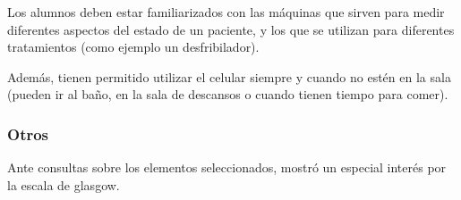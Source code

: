 Los alumnos deben estar familiarizados con las máquinas que sirven para
medir diferentes aspectos del estado de un paciente, y los que se
utilizan para diferentes tratamientos (como ejemplo un desfribilador).

Además, tienen permitido utilizar el celular siempre y cuando no estén
en la sala (pueden ir al baño, en la sala de descansos o cuando tienen
tiempo para comer).

\subsubsection{Otros}\label{otros}

Ante consultas sobre los elementos seleccionados, mostró un especial
interés por la escala de glasgow.
